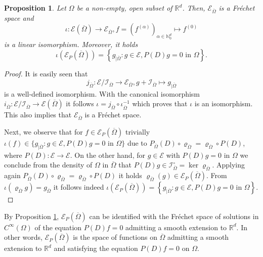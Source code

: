 \documentclass[10pt,leqno]{amsart}
\newtheorem{prop}{Proposition}%
\theoremstyle{definition}
\newcommand{\R}{\mathbb R}
\newcommand{\N}{\mathbb N}
\newcommand{\cI}{\mathcal I}
\let\rho\varrho
\begin{document}
\begin{prop}\label{prop-kernels}
	Let $\Omega$ be a non-empty, open subset of $\R^d$. Then, $\mathscr{E}_{\overline{\Omega}}$ is a Fr\'echet space and
	$$\iota\colon\mathscr{E}(\overline{\Omega})\to \mathscr{E}_{\overline{\Omega}}, f=(f^{(\alpha)})_{\alpha\in\N_0^d}\mapsto f^{(0)}$$
	is a linear isomorphism. Moreover, it holds
	$$\iota(\mathscr{E}_P(\overline{\Omega}))=\left\{g_{\mid\overline{\Omega}}\colon g\in\mathscr{E} , P(D)g=0\text{ in }\Omega\right\}.$$
\end{prop}	

\begin{proof}
	It is easily seen that $$j_{\overline{\Omega}}\colon \mathscr{E}/\cI_{\overline{\Omega}}\to\mathscr{E}_{\overline{\Omega}}, g+\cI_{\overline{\Omega}}\mapsto g_{\mid\overline{\Omega}}$$
	is a well-defined isomorphism. With the canonical isomorphism $i_{\overline{\Omega}}\colon\mathscr{E}/\cI_{\overline{\Omega}}\to\mathscr{E}(\overline{\Omega})$ it follows $\iota=j_{\overline{\Omega}}\circ\iota_{\overline{\Omega}}^{-1}$ which proves that $\iota$ is an isomorphism. This also implies that $\mathscr{E}_{\overline{\Omega}}$ is a Fr\'echet space.
	
	Next, we observe that for $f\in\mathscr{E}_P(\overline{\Omega})$ trivially $\iota(f)\in\{g_{\mid\overline{\Omega}}\colon g\in\mathscr{E} , P(D)g=0\text{ in }\Omega\}$ due to $P_{\overline{\Omega}}(D)\circ\rho_{\overline{\Omega}}=\rho_{\overline{\Omega}}\circ P(D)$, where $P(D)\colon\mathscr{E} \to\mathscr{E} $. On the other hand, for $g\in\mathscr{E} $ with $P(D)g=0$ in $\Omega$ we conclude from the density of $\Omega$ in $\overline{\Omega}$ that $P(D)g\in\cI_{\overline{\Omega}}^\circ=\ker\rho_{\overline{\Omega}}$. Applying again $P_{\overline{\Omega}}(D)\circ\rho_{\overline{\Omega}}=\rho_{\overline{\Omega}}\circ P(D)$ it holds $\rho_{\overline{\Omega}}(g)\in\mathscr{E}_P(\overline{\Omega})$. From $\iota(\rho_{\overline{\Omega}}g)=g_{\overline{\Omega}}$ it follows indeed $\iota(\mathscr{E}_P(\overline{\Omega}))=\left\{g_{\mid\overline{\Omega}}\colon g\in\mathscr{E} , P(D)g=0\text{ in }\Omega\right\}.$
\end{proof}


By Proposition \ref{prop-kernels}, $\mathscr{E}_P(\overline{\Omega})$ can be identified with the Fr\'echet space of solutions in $C^\infty(\Omega)$ of the equation $P(D)f=0$ admitting a smooth extension to $\R^d$. In other words, $\mathscr{E}_P(\overline{\Omega})$ is the space of functions on $\overline\Omega$ admitting a smooth extension to $\R^d$ and satisfying the equation $P(D)f=0$ on $\Omega$.\\
\end{document}
